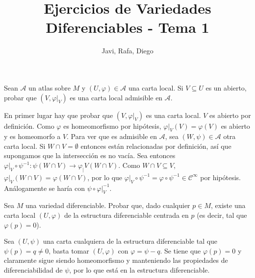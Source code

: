 \documentclass[twoside]{article}
\begin{document}
\title{Ejercicios de Variedades Diferenciables - Tema 1}
\author{Javi, Rafa, Diego}
\maketitle



\begin{ejercicio}{1}
Sean $\mathcal{A}$ un atlas sobre $M$ y $(U,\varphi)\in\mathcal{ A }$ una carta local. Si $V\subseteq U$ es un
abierto, probar que $(V, \varphi|_V )$ es una carta local admisible en $\mathcal{A}$.
\end{ejercicio}
\begin{solucion}
En primer lugar hay que probar que $(V, \varphi|_V )$ es una carta local. $V$ es abierto por definición. Como $\varphi$ es homeomorfismo por hipótesis, $\varphi|_V (V)=\varphi(V)$ es abierto y es homeomorfo a $V$. Para ver que es admisible en $\mathcal{A}$, sea $(W,\psi)\in\mathcal{A}$ otra carta local. Si $W\cap V=\emptyset$ entonces están relacionadas por definición, así que supongamos que la intersección es no vacía. Sea entonces $\varphi|_V\circ\psi^{-1}:\psi(W\cap V)\to\varphi_|V (W\cap V)$. Como $W\cap V\subseteq V$, $\varphi|_V (W\cap V)=\varphi(W\cap V)$, por lo que $\varphi|_V\circ\psi^{-1}=\varphi\circ\psi^{-1}\in\mathcal{C}^\infty$ por hipótesis. Análogamente se haría con $\psi\circ\varphi|_V^{-1}$.
\end{solucion}

\begin{ejercicio}{2}
Sea $M$ una variedad diferenciable. Probar que, dado cualquier $p \in M$, existe
una carta local $(U, \varphi)$ de la estructura diferenciable centrada en $p$ (es decir,
tal que $\varphi(p) = 0$).
\end{ejercicio}
\begin{solucion}
Sea $(U,\psi)$ una carta cualquiera de la estructura diferenciable tal que $\psi(p)=q\neq 0$, basta tomar $(U,\varphi)$ con $\varphi=\psi-q$. Se tiene que $\varphi(p)=0$ y claramente sigue siendo homeomorfismo y manteniendo las propiedades de diferenciabilidad de $\psi$, por lo que está en la estructura diferenciable.
\end{solucion}
\end{document}
